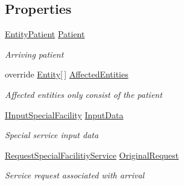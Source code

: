 \subsection*{Properties}
\begin{DoxyCompactItemize}
\item 
\hyperlink{class_general_health_care_elements_1_1_entities_1_1_entity_patient}{Entity\+Patient} \hyperlink{class_general_health_care_elements_1_1_special_facility_1_1_event_special_facility_patient_arrival_a8abc2c1dee6da5de7d4378d84b034757}{Patient}
\begin{DoxyCompactList}\small\item\em Arriving patient \end{DoxyCompactList}\item 
override \hyperlink{class_simulation_core_1_1_h_c_c_m_elements_1_1_entity}{Entity}\mbox{[}$\,$\mbox{]} \hyperlink{class_general_health_care_elements_1_1_special_facility_1_1_event_special_facility_patient_arrival_abfe8654eb338fa68baba151e88bfdd79}{Affected\+Entities}
\begin{DoxyCompactList}\small\item\em Affected entities only consist of the patient \end{DoxyCompactList}\item 
\hyperlink{interface_general_health_care_elements_1_1_special_facility_1_1_i_input_special_facility}{I\+Input\+Special\+Facility} \hyperlink{class_general_health_care_elements_1_1_special_facility_1_1_event_special_facility_patient_arrival_a1f60b8a4af42e16ff4aeaf872d5fe686}{Input\+Data}
\begin{DoxyCompactList}\small\item\em Special service input data \end{DoxyCompactList}\item 
\hyperlink{class_general_health_care_elements_1_1_special_facility_1_1_request_special_facilitiy_service}{Request\+Special\+Facilitiy\+Service} \hyperlink{class_general_health_care_elements_1_1_special_facility_1_1_event_special_facility_patient_arrival_ab2340e4557ee282febe6f127e4b94f4a}{Original\+Request}
\begin{DoxyCompactList}\small\item\em Service request associated with arrival \end{DoxyCompactList}\end{DoxyCompactItemize}


